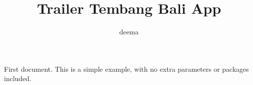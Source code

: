 \documentclass{screenplay}[2012/06/30]
\title{Trailer Tembang Bali App}
\author{deema}
\begin{document}
First document. This is a simple example, with no 
extra parameters or packages included.
\end{document}

